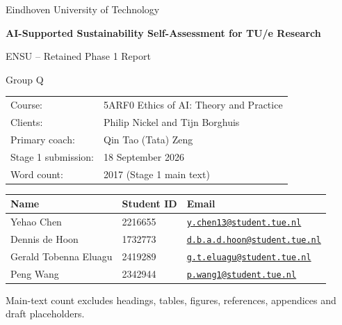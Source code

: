 \documentclass[11pt,a4paper]{article}
\newcommand{\mainwordcount}{2017}
\begin{document}
\hypersetup{pageanchor=false}
\begin{titlepage}
\centering
\vspace*{3cm}
{\Large Eindhoven University of Technology\par}
\vspace{1.5cm}
{\huge\bfseries AI-Supported Sustainability Self-Assessment for TU/e Research\par}
\vspace{0.6cm}
{\Large ENSU -- Retained Phase 1 Report\par}
{\Large Group Q\par}
\vfill
\begin{tabularx}{0.95\textwidth}{@{}lX@{}}
Course: & 5ARF0 Ethics of AI: Theory and Practice \\
Clients: & Philip Nickel and Tijn Borghuis \\
Primary coach: & Qin Tao (Tata) Zeng \\
Stage 1 submission: & 18 September 2026 \\
Word count: & \mainwordcount{} (Stage 1 main text)
\end{tabularx}

\vspace{1cm}
\begin{tabularx}{0.95\textwidth}{@{}p{}p{}X@{}}
\toprule
Name & Student ID & Email \\
\midrule
Yehao Chen & 2216655 & \href{mailto:y.chen13@student.tue.nl}{\nolinkurl{y.chen13@student.tue.nl}} \\
Dennis de Hoon & 1732773 & \href{mailto:d.b.a.d.hoon@student.tue.nl}{\nolinkurl{d.b.a.d.hoon@student.tue.nl}} \\
Gerald Tobenna Eluagu & 2419289 & \href{mailto:g.t.eluagu@student.tue.nl}{\nolinkurl{g.t.eluagu@student.tue.nl}} \\
Peng Wang & 2342944 & \href{mailto:p.wang1@student.tue.nl}{\nolinkurl{p.wang1@student.tue.nl}} \\
\bottomrule
\end{tabularx}

\vspace{0.6cm}
{\footnotesize Main-text count excludes headings, tables, figures, references, appendices and draft placeholders.\par}

\vfill
\end{titlepage}
\hypersetup{pageanchor=true}


\end{document}
